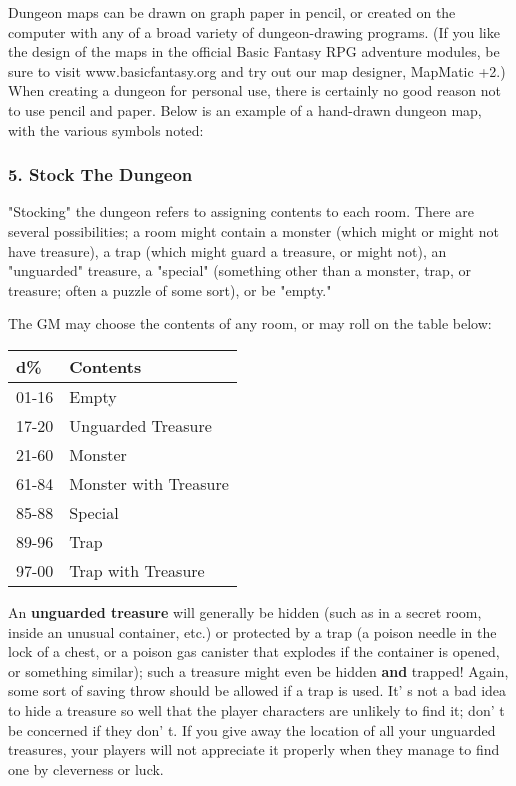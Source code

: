 \documentclass[a4paper,twoside,openany,10pt]{book}
\begin{document}
\begin{multicols}{2}
Dungeon maps can be drawn on graph paper in pencil, or created on the computer with any of a broad variety of dungeon-drawing programs. (If you like the design of the maps in the official Basic Fantasy RPG adventure modules, be sure to visit www.basicfantasy.org and try out our map designer, MapMatic +2.) When creating a dungeon for personal use, there is certainly no good reason not to use pencil and paper. Below is an example of a hand-drawn dungeon map, with the various symbols noted:


\subsubsection{5. Stock The Dungeon}\label{stock-the-dungeon}

"Stocking" the dungeon refers to assigning contents to each room. There are several possibilities; a room might contain a monster (which might or might not have treasure), a trap (which might guard a treasure, or might not), an "unguarded" treasure, a "special" (something other than a monster, trap, or treasure; often a puzzle of some sort), or be "empty."

The GM may choose the contents of any room, or may roll on the table below:\medskip


\begin{tabular*}{0.93\linewidth}{@{\extracolsep{\fill}}ll}
\textbf{d\%} & \textbf{Contents} \\\toprule
01-16 & Empty \\\hline
17-20 & Unguarded Treasure \\\hline
21-60 & Monster \\\hline
61-84 & Monster with Treasure \\\hline
85-88 & Special \\\hline
89-96 & Trap \\\hline
97-00 & Trap with Treasure \\\bottomrule
\end{tabular*}\medskip

An \textbf{unguarded treasure} will generally be hidden (such as in a secret room, inside an unusual container, etc.) or protected by a trap (a poison needle in the lock of a chest, or a poison gas canister that explodes if the container is opened, or something similar); such a treasure might even be hidden \textbf{and }trapped! Again, some sort of saving throw should be allowed if a trap is used. It' s not a bad idea to hide a treasure so well that the player characters are unlikely to find it; don' t be concerned if they don' t. If you give away the location of all your unguarded treasures, your players will not appreciate it properly when they manage to find one by cleverness or luck. 


\end{multicols}
\end{document}
